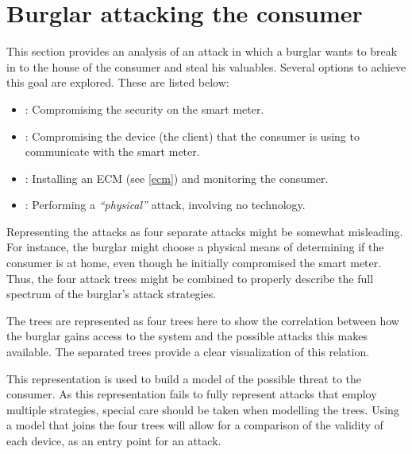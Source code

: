 \section{Burglar attacking the consumer}\label{attacktree:burglar}
This section provides an analysis of an attack in which a burglar wants to break in to the house of the consumer and steal his valuables.
Several options to achieve this goal are explored.
These are listed below:
\begin{itemize}
  \item {}: Compromising the security on the smart meter.
  \item {}: Compromising the device (the client) that the consumer is using to communicate with the smart meter.
  \item {}: Installing an ECM (see \cref{ecm}) and monitoring the consumer.
  \item {}: Performing a \emph{``physical''} attack, involving no technology.
\end{itemize}

Representing the attacks as four separate attacks might be somewhat misleading.
For instance, the burglar might choose a physical means of determining if the consumer is at home, even though he initially compromised the smart meter.
Thus, the four attack trees might be combined to properly describe the full spectrum of the burglar's attack strategies.

The trees are represented as four trees here to show the correlation between how the burglar gains access to the system and the possible attacks this makes available.
The separated trees provide a clear visualization of this relation.

This representation is used to build a model of the possible threat to the consumer.
As this representation fails to fully represent attacks that employ multiple strategies, special care should be taken when modelling the trees.
Using a model that joins the four trees will allow for a comparison of the validity of each device, as an entry point for an attack.




